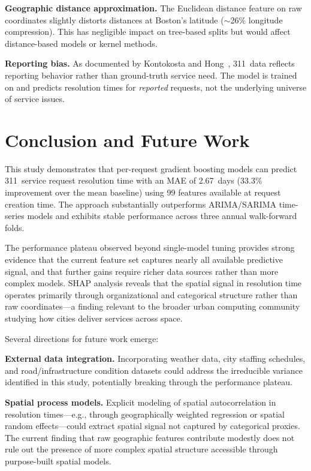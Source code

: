 \documentclass[sigconf,nonacm]{acmart}
\begin{document}
\textbf{Geographic distance approximation.} The Euclidean
distance feature on raw coordinates slightly distorts distances
at Boston's latitude ($\sim$26\% longitude compression). This
has negligible impact on tree-based splits but would affect
distance-based models or kernel methods.

\textbf{Reporting bias.} As documented by Kontokosta and
Hong~\cite{kontokosta2021bias}, 311~data reflects reporting
behavior rather than ground-truth service need. The model is
trained on and predicts resolution times for \emph{reported}
requests, not the underlying universe of service issues.

\section{Conclusion and Future Work}
\label{sec:conclusion}

This study demonstrates that per-request gradient boosting models
can predict 311~service request resolution time with an MAE of
2.67~days (33.3\% improvement over the mean baseline) using 99
features available at request creation time. The approach
substantially outperforms ARIMA/SARIMA time-series models and
exhibits stable performance across three annual walk-forward
folds.

The performance plateau observed beyond single-model tuning
provides strong evidence that the current feature set captures
nearly all available predictive signal, and that further gains
require richer data sources rather than more complex models. SHAP
analysis reveals that the spatial signal in resolution time
operates primarily through organizational and categorical
structure rather than raw coordinates---a finding relevant to the
broader urban computing community studying how cities deliver
services across space.

Several directions for future work emerge:

\textbf{External data integration.} Incorporating weather data,
city staffing schedules, and road/infrastructure condition
datasets could address the irreducible variance identified in
this study, potentially breaking through the performance plateau.

\textbf{Spatial process models.} Explicit modeling of spatial
autocorrelation in resolution times---e.g., through geographically
weighted regression or spatial random effects---could extract
spatial signal not captured by categorical proxies. The current
finding that raw geographic features contribute modestly does not
rule out the presence of more complex spatial structure
accessible through purpose-built spatial models.
\end{document}
